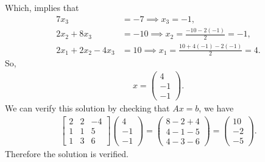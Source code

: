 \documentclass{report}
\begin{document}
    Which, implies that
    \begin{align*}
        7x_{3} &= - 7 \implies x_{3} = -1, \\
        2x_{2} + 8x_{3} &= -10 \implies x_{2} = \frac{-10 - 2(-1)}{2} = -1, \\
        2x_{1} + 2x_{2} - 4x_{3} &= 10 \implies x_{1} = \frac{10+4(-1)-2(-1)}{2} = 4
    .\end{align*}
    So,
    \begin{align*}
        x = \begin{pmatrix} 4 \\ -1 \\ -1 \end{pmatrix}
    .\end{align*}
    We can verify this solution by checking that $Ax = b$, we have
    \begin{align*}
        \begin{bmatrix}
            2 & 2 & -4 \\
            1 & 1 & 5 \\
            1 & 3 & 6
        \end{bmatrix}
        \begin{pmatrix} 4 \\ -1 \\ -1 \end{pmatrix}
        =
        \begin{pmatrix} 8 - 2 + 4 \\ 4-1 -5 \\ 4-3-6 \end{pmatrix} = \begin{pmatrix} 10 \\ -2 \\ -5 \end{pmatrix}
    .\end{align*}
    Therefore the solution is verified.
\end{document}
